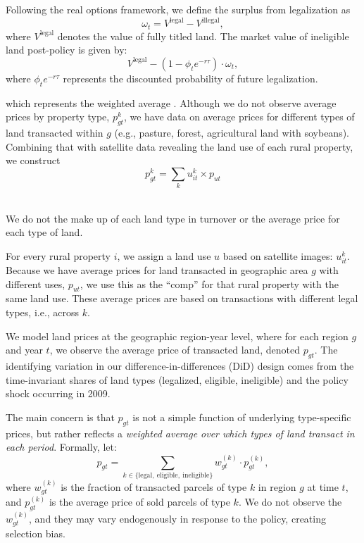 \documentclass[12pt]{article}
\begin{document}
Following the real options framework, we define the surplus from legalization as
\[
\omega_t = V^{\text{legal}} - V^{\text{illegal}},
\]
where $V^{\text{legal}}$ denotes the value of fully titled land. The market value of ineligible land post-policy is given by:
\[
V^{\text{legal}} - (1 - \phi_t e^{-r\tau}) \cdot \omega_t,
\]
where $\phi_t e^{-r\tau}$ represents the discounted probability of future legalization.
 
which represents the weighted average . Although we do not observe average prices by property type, $p_{gt}^k$, we have data on average prices for different types of land transacted within $g$ (e.g., pasture, forest, agricultural land with soybeans). Combining that with satellite data revealing the land use of each rural property, we construct
\begin{equation*}
  p_{gt}^k=\sum_ku_{it}^k\times p_{ut}  
\end{equation*}
\ 

\quad We do not the make up of each land type in turnover or the average price for each type of land. 


For every rural property $i$, we assign a land use $u$ based on satellite images: $u_{it}^k$. Because we have average prices for land transacted in geographic area $g$ with different uses, $p_{ut}$, we use this as the ``comp'' for that rural property with the same land use. These average prices are based on transactions with different legal types, i.e., across $k$. 


We model land prices at the geographic region-year level, where for each region $g$ and year $t$, we observe the average price of transacted land, denoted $p_{gt}$. The identifying variation in our difference-in-differences (DiD) design comes from the time-invariant shares of land types (legalized, eligible, ineligible) and the policy shock occurring in 2009.
 

The main concern is that $p_{gt}$ is not a simple function of underlying type-specific prices, but rather reflects a \textit{weighted average over which types of land transact in each period}. Formally, let:
\[
p_{gt} = \sum_{k \in \{\text{legal}, \ \text{eligible}, \ \text{ineligible}\}} w_{gt}^{(k)} \cdot p_{gt}^{(k)},
\]
where $w_{gt}^{(k)}$ is the fraction of transacted parcels of type $k$ in region $g$ at time $t$, and $p_{gt}^{(k)}$ is the average price of sold parcels of type $k$. We do not observe the $w_{gt}^{(k)}$, and they may vary endogenously in response to the policy, creating selection bias.
\end{document}
